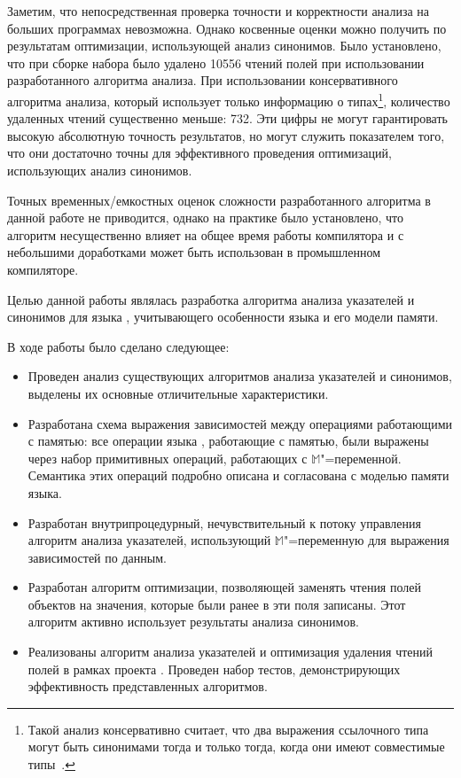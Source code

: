 \documentclass[14pt,titlepage,draft]{extarticle}
\newcommand{\java}{\eng{Java}\xspace}
\newcommand{\M}{\ensuremath{\mathbb{M}}}
\begin{document}
    Заметим, что непосредственная проверка точности и корректности анализа на
    больших программах невозможна. Однако косвенные оценки можно получить по
    результатам оптимизации, использующей анализ синонимов. Было установлено,
    что при сборке набора  было удалено \num{10556} чтений
    полей при использовании разработанного алгоритма анализа. При использовании
    консервативного алгоритма анализа, который использует только информацию о
    типах\footnote{
      Такой анализ консервативно считает, что два выражения ссылочного типа
      могут быть синонимами тогда и только тогда, когда они имеют совместимые
      типы~\cite{diwan_tbaa}.
    },
    количество удаленных чтений существенно меньше: \num{732}.
    Эти цифры не могут гарантировать высокую абсолютную точность результатов,
    но могут служить показателем того, что они достаточно точны для
    эффективного проведения оптимизаций, использующих анализ синонимов.

    Точных временных/емкостных оценок сложности разработанного алгоритма в
    данной работе не приводится, однако на практике было установлено, что
    алгоритм несущественно влияет на общее время работы компилятора и с
    небольшими доработками может быть использован в промышленном компиляторе.


    Целью данной работы являлась разработка алгоритма анализа указателей и
    синонимов для языка \java, учитывающего особенности языка и его модели
    памяти.

    В ходе работы было сделано следующее:
    \begin{itemize}
      \item Проведен анализ существующих алгоритмов анализа указателей и
            синонимов, выделены их основные отличительные характеристики.
      \item Разработана схема выражения зависимостей между операциями
            работающими с памятью: все операции языка \java, работающие с
            памятью, были выражены через набор примитивных операций, работающих
            с \M"=переменной. Семантика этих операций подробно описана и
            согласована с моделью памяти языка.
      \item Разработан внутрипроцедурный, нечувствительный к потоку управления
            алгоритм анализа указателей, использующий \M"=переменную для
            выражения зависимостей по данным.
      \item Разработан алгоритм оптимизации, позволяющей заменять чтения полей
            объектов на значения, которые были ранее в эти поля записаны. Этот
            алгоритм активно использует результаты анализа синонимов.
      \item Реализованы алгоритм анализа указателей и оптимизация удаления
            чтений полей в рамках проекта . Проведен набор
            тестов, демонстрирующих эффективность представленных алгоритмов.
    \end{itemize}
\end{document}
